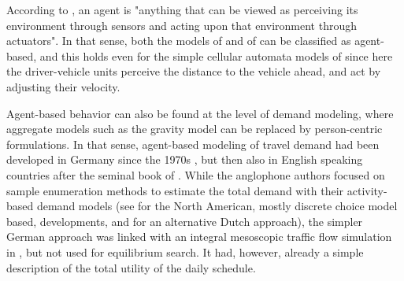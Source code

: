 According to \citet[][p.~53]{RusselNorvig2010ArtificialIntelligence}, an agent is "anything that can be viewed as perceiving its environment through sensors and acting upon that environment through actuators". In that sense, both the models of \citet{Seddon_Simulation_1972} and of \citet{Wiedemann_PhDThesis_1974} can be classified as agent-based, and this holds even for the simple cellular automata models of \citet{NagelSchreckenberg1992CA} since here the driver-vehicle units perceive the distance to the vehicle ahead, and act by adjusting their velocity.  

Agent-based behavior can also be found at the level of demand modeling, where aggregate models such as the gravity model \citep{Wilson1971SpatialInteraction} can be replaced by person-centric formulations. In that sense, 
%
agent-based modeling of travel demand had been developed in Germany since the 1970s \citep[see the references in][]{AxhausenHerz_JTE_1989}, but then also in English speaking countries after the seminal book of \citet[][]{JonesEtAl_1983}.  
%
%
While the anglophone authors focused on sample enumeration methods to estimate the total demand with their 
activity-based demand models (see \citet[][]{BradleyBowman_TRBTDF_2006} for the North American, mostly discrete choice model based, developments, and \citet[][]{ArentzeTimmermans_2000} for an alternative Dutch approach), the simpler German approach was linked with an integral mesoscopic traffic flow simulation in \citet[][]{Axhausen_PhDThesis_1988}, but not used for equilibrium search. It had, however, already a simple description of the total utility of the daily schedule.


